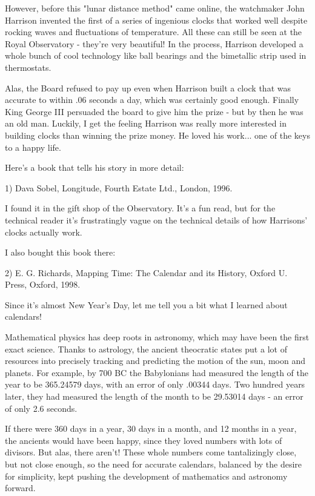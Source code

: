 However, before this "lunar distance method" came online, the watchmaker 
John Harrison invented the first of a series of ingenious clocks that worked
well despite rocking waves and fluctuations of temperature.  All these
can still be seen at the Royal Observatory - they're very beautiful!
In the process, Harrison developed a whole bunch of cool technology like 
ball bearings and the bimetallic strip used in thermostats. 

Alas, the Board refused to pay up even when Harrison built a clock that
was accurate to within .06 seconds a day, which was certainly good
enough.  Finally King George III persuaded the board to give him the
prize - but by then he was an old man.  Luckily, I get the feeling
Harrison was really more interested in building clocks than winning the
prize money.  He loved his work... one of the keys to a happy life.

Here's a book that tells his story in more detail:

1) Dava Sobel, Longitude, Fourth Estate Ltd., London, 1996.

I found it in the gift shop of the Observatory.  It's a fun read, but
for the technical reader it's frustratingly vague on the technical
details of how Harrisons' clocks actually work.  

I also bought this book there:

2) E. G. Richards, Mapping Time: The Calendar and its History, Oxford
U. Press, Oxford, 1998.

Since it's almost New Year's Day, let me tell you a bit what I
learned about calendars!

Mathematical physics has deep roots in astronomy, which may have been
the first exact science.  Thanks to astrology, the ancient theocratic
states put a lot of resources into precisely tracking and predicting the
motion of the sun, moon and planets.  For example, by 700 BC the
Babylonians had measured the length of the year to be 365.24579 days,
with an error of only .00344 days.  Two hundred years later, they had
measured the length of the month to be 29.53014 days - an error of only
2.6 seconds.

If there were 360 days in a year, 30 days in a month, and 12 months in a
year, the ancients would have been happy, since they loved numbers with
lots of divisors.  But alas, there aren't!  These whole numbers come
tantalizingly close, but not close enough, so the need for accurate
calendars, balanced by the desire for simplicity, kept pushing the
development of mathematics and astronomy forward.  

